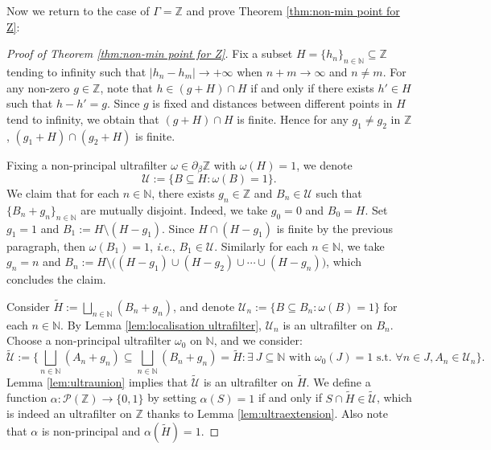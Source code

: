 \documentclass[12pt, a4paper]{amsart}
\numberwithin{equation}{section}
\newtheorem{cor}[thm]{Corollary}
\theoremstyle{definition}
\theoremstyle{remark}
\def\NN{\mathbb{N}}
\def\ZZ{\mathbb{Z}}
\def\U{\mathcal{U}}
\def\P{\mathcal{P}}
\begin{document}
%

Now we return to the case of $\Gamma=\ZZ$ and prove Theorem \ref{thm:non-min point for Z}:

\begin{proof}[Proof of Theorem \ref{thm:non-min point for Z}]
Fix a subset $H=\{h_n\}_{n\in \NN} \subseteq \ZZ$ tending to infinity such that $|h_n -h_m| \to +\infty$ when $n+m \to \infty$ and $n\neq m$. For any non-zero $g\in \ZZ$, note that $h\in (g+H) \cap H$ if and only if there exists $h' \in H$ such that $h-h'=g$. Since $g$ is fixed and distances between different points in $H$ tend to infinity, we obtain that $(g+H) \cap H$ is finite. Hence for any $g_1 \neq g_2$ in $\ZZ$, $(g_1+H) \cap (g_2 + H)$ is finite.

Fixing a non-principal ultrafilter $\omega \in \partial_\beta \ZZ$ with $\omega(H)=1$, we denote 
\[
\U:=\{B \subseteq H: \omega(B)=1\}. 
\]
We claim that for each $n\in \NN$, there exists $g_n \in \ZZ$ and $B_n \in \U$ such that $\{B_n+g_n\}_{n\in \NN}$ are mutually disjoint. Indeed, we take $g_0=0$ and $B_0 = H$. Set $g_1=1$ and $B_1:=H \setminus (H-g_1)$. Since $H \cap (H-g_1)$ is finite by the previous paragraph, then $\omega(B_1)=1$, \emph{i.e.}, $B_1 \in \U$. Similarly for each $n \in \NN$, we take $g_n=n$ and $B_n:=H \setminus \big( (H-g_1) \cup (H-g_2) \cup \cdots \cup (H-g_{n}) \big)$, which concludes the claim.

Consider $\widetilde{H}:=\bigsqcup_{n\in \NN} (B_n + g_n)$, and denote $\U_n:=\{B \subseteq B_n: \omega(B)=1\}$ for each $n\in \NN$. By Lemma \ref{lem:localisation ultrafilter}, $\U_n$ is an ultrafilter on $B_n$. Choose a non-principal ultrafilter $\omega_0$ on $\NN$, and we consider:
\[
\widetilde{\U}:=\big\{ \bigsqcup_{n\in \NN} (A_n + g_n) \subseteq \bigsqcup_{n\in \NN} (B_n + g_n) = \widetilde{H}: \exists~J \subseteq \NN \text{ with } \omega_0(J)=1 \text{ s.t. } \forall n\in J, A_n \in \U_n \big\}.
\]
Lemma \ref{lem:ultraunion} implies that $\widetilde{\U}$ is an ultrafilter on $\widetilde{H}$. We define a function $\alpha: \P(\ZZ) \to \{0,1\}$ by setting $\alpha(S)=1$ if and only if $S \cap \widetilde{H} \in \widetilde{\U}$, which is indeed an ultrafilter on $\ZZ$ thanks to Lemma \ref{lem:ultraextension}. Also note that $\alpha$ is non-principal and $\alpha(\widetilde{H})=1$.


\end{proof}
\end{document}
